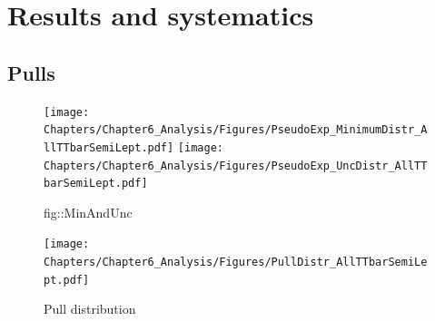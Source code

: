 \section{Results and systematics} \label{sec::Meas}


\subsection{Pulls}

\begin{figure}[h!t]
 \centering
 \texttt{[image: Chapters/Chapter6\_Analysis/Figures/PseudoExp\_MinimumDistr\_AllTTbarSemiLept.pdf]}
 \texttt{[image: Chapters/Chapter6\_Analysis/Figures/PseudoExp\_UncDistr\_AllTTbarSemiLept.pdf]}
 \caption{Minimum and uncertainty distribution obtained for the 1000 considered pseudo experiments. (all semiLept TT)}  \caption{fig::MinAndUnc}
\end{figure}

\begin{figure}[h!t]
 \centering
 \texttt{[image: Chapters/Chapter6\_Analysis/Figures/PullDistr\_AllTTbarSemiLept.pdf]}
 \caption{Pull distribution} \label{fig::PullDistr}
\end{figure}


